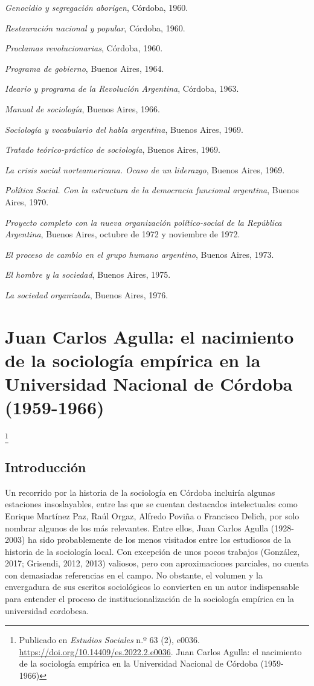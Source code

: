 \emph{Genocidio y segregación aborigen}, Córdoba, 1960.

\emph{Restauración nacional y popular}, Córdoba, 1960.

\emph{Proclamas revolucionarias}, Córdoba, 1960.

\emph{Programa de gobierno}, Buenos Aires, 1964.

\emph{Ideario y programa de la Revolución Argentina}, Córdoba, 1963.

\emph{Manual de sociología}, Buenos Aires, 1966.

\emph{Sociología y vocabulario del habla argentina}, Buenos Aires, 1969.

\emph{Tratado teórico-práctico de sociología}, Buenos Aires, 1969.

\emph{La crisis social norteamericana. Ocaso de un liderazgo}, Buenos Aires, 1969.

\emph{Política Social. Con la estructura de la democracia funcional argentina}, Buenos Aires, 1970.

\emph{Proyecto completo con la nueva organización político-social de la República Argentina}, Buenos Aires, octubre de 1972 y noviembre de 1972.

\emph{El proceso de cambio en el grupo humano argentino}, Buenos Aires, 1973.

\emph{El hombre y la sociedad}, Buenos Aires, 1975.

\emph{La sociedad organizada}, Buenos Aires, 1976.


\chapter{Juan Carlos Agulla: el nacimiento de la sociología empírica en la Universidad Nacional de Córdoba (1959-1966)}

\footnote{Publicado en \emph{Estudios Sociales} n.º 63 (2), e0036. \url{https://doi.org/10.14409/es.2022.2.e0036}. Juan Carlos Agulla: el nacimiento de la sociología empírica en la Universidad Nacional de Córdoba (1959-1966)}

\section{Introducción}

Un recorrido por la historia de la sociología en Córdoba incluiría algunas estaciones insoslayables, entre las que se cuentan destacados intelectuales como Enrique Martínez Paz, Raúl Orgaz, Alfredo Poviña o Francisco Delich, por solo nombrar algunos de los más relevantes. Entre ellos, Juan Carlos Agulla (1928-2003) ha sido probablemente de los menos visitados entre los estudiosos de la historia de la sociología local. Con excepción de unos pocos trabajos \parencite{1447-CARACCIOLO2010,1558-CHAMORROGRECA2007}(González, 2017; Grisendi, 2012, 2013) valiosos, pero con aproximaciones parciales, no cuenta con demasiadas referencias en el campo. No obstante, el volumen y la envergadura de sus escritos sociológicos lo convierten en un autor indispensable para entender el proceso de institucionalización de la sociología empírica en la universidad cordobesa.

